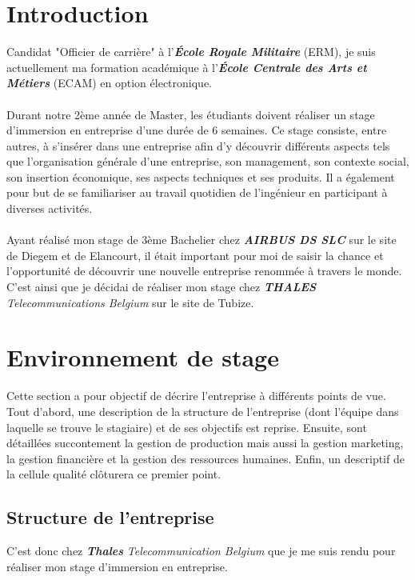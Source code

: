 \documentclass[10pt, oneside, a4paper]{article}
\begin{document}
\tableofcontents
\newpage


\section*{Introduction}

Candidat "Officier de carrière" à l’\textbf{\textit{École Royale Militaire}} (ERM), je suis actuellement ma formation académique à l’\textbf{\textit{École Centrale des Arts et Métiers}} (ECAM) en option électronique. \\ \\
Durant notre 2ème année de Master, les étudiants doivent réaliser un stage d’immersion en entreprise d’une durée de 6 semaines. Ce stage consiste, entre autres, à s’insérer dans une entreprise afin d’y découvrir différents aspects tels que l’organisation générale d’une entreprise, son management, son contexte social, son insertion économique, ses aspects techniques et ses produits. Il a également pour but de se familiariser au travail quotidien de l’ingénieur en participant à diverses activités. \\ \\
Ayant réalisé mon stage de 3ème Bachelier chez \textbf{\textit{AIRBUS DS SLC}} sur le site de Diegem et de Elancourt, il était important pour moi de saisir la chance et l’opportunité de découvrir une nouvelle entreprise renommée à travers le monde. C'est ainsi que je décidai de réaliser mon stage chez \textit{\textbf{THALES} Telecommunications Belgium} sur le site de Tubize. 

\newpage

\section{Environnement de stage}
Cette section a pour objectif de décrire l'entreprise à différents points de vue. Tout d'abord, une description de la structure de l'entreprise (dont l'équipe dans laquelle se trouve le stagiaire) et de ses objectifs est reprise. Ensuite, sont détaillées succontement la gestion de production mais aussi la gestion marketing, la gestion financière et la gestion des ressources humaines. Enfin, un descriptif de la cellule qualité clôturera ce premier point.

\subsection{Structure de l'entreprise}
C'est donc chez \textbf{\textit{Thales}} \textit{Telecommunication Belgium} que je me suis rendu pour réaliser mon stage d'immersion en entreprise. 
\end{document}
